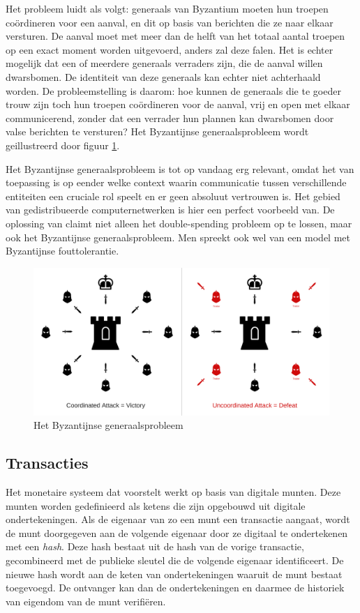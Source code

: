 			Het probleem luidt als volgt: generaals van Byzantium moeten hun troepen coördineren voor een aanval, en dit op basis van berichten die ze naar elkaar versturen. De aanval moet met meer dan de helft van het totaal aantal troepen op een exact moment worden uitgevoerd, anders zal deze falen. Het is echter mogelijk dat een of meerdere generaals verraders zijn, die de aanval willen dwarsbomen. De identiteit van deze generaals kan echter niet achterhaald worden. De probleemstelling is daarom: hoe kunnen de generaals die te goeder trouw zijn toch hun troepen coördineren voor de aanval, vrij en open met elkaar communicerend, zonder dat een verrader hun plannen kan dwarsbomen door valse berichten te versturen? Het Byzantijnse generaalsprobleem wordt geillustreerd door figuur \ref{fig:byzantium}.~\autocite{Lamport1982}
			
			Het Byzantijnse generaalsprobleem is tot op vandaag erg relevant, omdat het van toepassing is op eender welke context waarin communicatie tussen verschillende entiteiten een cruciale rol speelt en er geen absoluut vertrouwen is. Het gebied van gedistribueerde computernetwerken is hier een perfect voorbeeld van. De oplossing van \textcite{Nakamoto2008} claimt niet alleen het double-spending probleem op te lossen, maar ook het Byzantijnse generaalsprobleem. Men spreekt ook wel van een model met Byzantijnse fouttolerantie. 
			
			\begin{figure}
				\includegraphics[width=\linewidth]{img/byzantine_generals.png}
				\caption{Het Byzantijnse generaalsprobleem~\autocite{Humanjets2018}}
				\label{fig:byzantium}
			\end{figure}
			
	\subsection{Transacties}
	Het monetaire systeem dat \textcite{Nakamoto2008} voorstelt werkt op basis van digitale munten. Deze munten worden gedefinieerd als ketens die zijn opgebouwd uit digitale ondertekeningen. Als de eigenaar van zo een munt een transactie aangaat, wordt de munt doorgegeven aan de volgende eigenaar door ze digitaal te ondertekenen met een \textit{hash}. Deze hash bestaat uit de hash van de vorige transactie, gecombineerd met de publieke sleutel die de volgende eigenaar identificeert. De nieuwe hash wordt aan de keten van ondertekeningen waaruit de munt bestaat toegevoegd. De ontvanger kan dan de ondertekeningen en daarmee de historiek van eigendom van de munt verifiëren.~\autocite{Nakamoto2008} 
			
